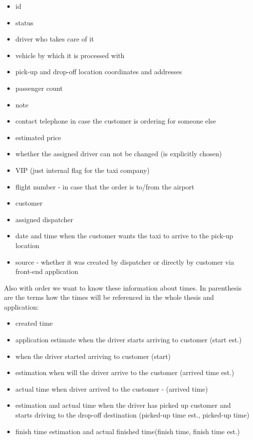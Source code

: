		\begin{itemize}
			\item id
			\item status 
			\item driver who takes care of it
			\item vehicle by which it is processed with
			\item pick-up and drop-off location coordinates and addresses
			\item passenger count
			\item note
			\item contact telephone in case the customer is ordering for someone else
			\item estimated price
			\item whether the assigned driver can not be changed (is explicitly chosen)
			\item VIP (just internal flag for the taxi company)
			\item flight number - in case that the order is to/from the airport
			\item customer
			\item assigned dispatcher
			\item date and time when the customer wants the taxi to arrive to the pick-up location
			\item source - whether it was created by dispatcher or directly by customer via front-end application
		\end{itemize}
		Also with order we want to know these information about times. In parenthesis are the terms how the times will be referenced in the whole thesis and application:
		\begin{itemize}
			\item created time
			\item application estimate when the driver starts arriving to customer (start est.)
			\item when the driver started arriving to customer (start)
			\item estimation when will the driver arrive to the customer (arrived time est.)
			\item actual time when driver arrived to the customer - (arrived time)
			\item estimation and actual time when the driver has picked up  customer and starts driving to the drop-off destination (picked-up time est., picked-up time)
			\item finish time estimation and actual finished time(finish time, finish time est.)
		\end{itemize}
		
